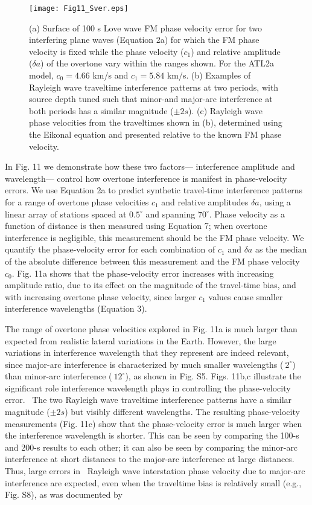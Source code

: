 \documentclass[extra,mreferee]{gji}
\begin{document}
\begin{figure}
 \texttt{[image: Fig11\_Sver.eps]}
 \caption{(a) Surface of 100 s Love wave FM phase velocity error for two interfering plane waves (Equation 2a) for which the FM phase velocity is fixed while the phase velocity ($c_1$) and relative amplitude ($\delta a$) of the overtone vary within the ranges shown. For the ATL2a model, $c_0=4.66$ km/s and $c_1=5.84$ km/s. (b) Examples of Rayleigh wave traveltime interference patterns at two periods, with source depth tuned such that minor-and major-arc interference at both periods has a similar magnitude ($\pm 2 s$). (c) Rayleigh wave phase velocities from the traveltimes shown in (b), determined using the Eikonal equation and presented relative to the known FM phase velocity. }
\end{figure} 

In Fig. 11 we demonstrate how these two factors— interference amplitude and wavelength— control how overtone interference is manifest in phase-velocity errors. We use Equation 2a to predict synthetic travel-time interference patterns for a range of overtone phase velocities $c_1$ and relative amplitudes $\delta a$, using a linear array of stations spaced at $0.5 ^\circ$ and spanning $70^\circ$. Phase velocity as a function of distance is then measured using Equation 7; when overtone interference is negligible, this measurement should be the FM phase velocity. We quantify the phase-velocity error for each combination of $c_1$ and $\delta a$ as the median of the absolute difference between this measurement and the FM phase velocity $c_0$. Fig. 11a shows that the phase-velocity error increases with increasing amplitude ratio, due to its effect on the magnitude of the travel-time bias, and with increasing overtone phase velocity, since larger $c_1$ values cause smaller interference wavelengths (Equation 3).

The range of overtone phase velocities explored in Fig. 11a is much larger than expected from realistic lateral variations in the Earth. However, the large variations in interference wavelength that they represent are indeed relevant, since major-arc interference is characterized by much smaller wavelengths ($~2^\circ$) than minor-arc interference ($~12^\circ$), as shown in Fig. S5. Figs. 11b,c illustrate the significant role interference wavelength plays in controlling the phase-velocity error.  The two Rayleigh wave traveltime interference patterns have a similar magnitude ($\pm 2 s$) but visibly different wavelengths. The resulting phase-velocity measurements (Fig. 11c) show that the phase-velocity error is much larger when the interference wavelength is shorter. This can be seen by comparing the 100-s and 200-s results to each other; it can also be seen by comparing the minor-arc interference at short distances to the major-arc interference at large distances. Thus, large errors in  Rayleigh wave interstation phase velocity due to major-arc interference are expected, even when the traveltime bias is relatively small (e.g., Fig. S8), as was documented by \citet{hariharan2020evidence}
\end{document}
